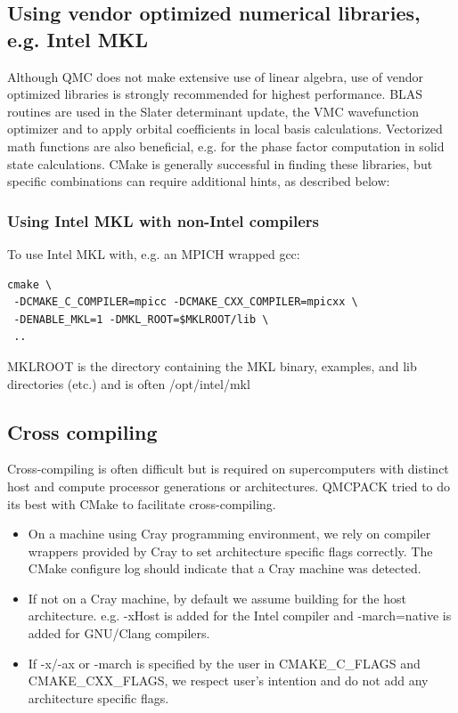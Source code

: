 \subsection{Using vendor optimized numerical libraries, e.g. Intel MKL}

Although QMC does not make extensive use of linear algebra, use of
vendor optimized libraries is strongly recommended for highest
performance. BLAS routines are used in the Slater determinant update, the VMC wavefunction optimizer
and to apply orbital coefficients in local basis calculations. Vectorized
math functions are also beneficial, e.g. for the phase factor
computation in solid state calculations. CMake is generally successful
in finding these libraries, but specific combinations can require
additional hints, as described below:

\subsubsection{Using Intel MKL with non-Intel compilers}

To use Intel MKL with, e.g. an MPICH wrapped gcc:
\verbatimfont{\footnotesize}
\begin{verbatim}
cmake \
 -DCMAKE_C_COMPILER=mpicc -DCMAKE_CXX_COMPILER=mpicxx \
 -DENABLE_MKL=1 -DMKL_ROOT=$MKLROOT/lib \
 ..
\end{verbatim}

MKLROOT is the directory containing the MKL binary, examples, and lib
directories (etc.) and is often /opt/intel/mkl

\subsection{Cross compiling}
Cross-compiling is often difficult but is required on supercomputers
with distinct host and compute processor generations or architectures.
QMCPACK tried to do its best with CMake to facilitate cross-compiling.

\begin{itemize}
  \item On a machine using Cray programming environment, we rely on
      compiler wrappers provided by Cray to set architecture specific
      flags correctly. The CMake configure log should indicate that a
      Cray machine was detected.
  \item If not on a Cray machine, by default we assume building for
    the host architecture. e.g. -xHost is added for the Intel compiler
    and -march=native is added for GNU/Clang compilers.
  \item If -x/-ax or -march is specified by the user in CMAKE\_C\_FLAGS and CMAKE\_CXX\_FLAGS,
    we respect user's intention and do not add any architecture specific flags.
\end{itemize}

